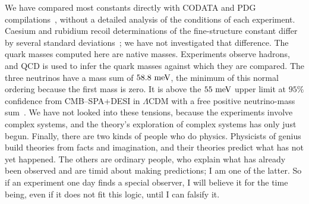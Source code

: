 \documentclass[aps,prx,reprint,longbibliography]{revtex4-2}
\begin{document}
We have compared most constants directly with CODATA and PDG compilations~\cite{CODATA,PDG}, without a detailed analysis of the conditions of each experiment. Caesium and rubidium recoil determinations of the fine-structure constant differ by several standard deviations~\cite{Parker,Morel}; we have not investigated that difference. The quark masses computed here are native masses. Experiments observe hadrons, and QCD is used to infer the quark masses against which they are compared. The three neutrinos have a mass sum of $58.8\ {\rm meV}$, the minimum of this normal ordering because the first mass is zero. It is above the $55\ {\rm meV}$ upper limit at $95\%$ confidence from CMB--SPA+DESI in $\Lambda$CDM with a free positive neutrino-mass sum~\cite{SPT}. We have not looked into these tensions, because the experiments involve complex systems, and the theory's exploration of complex systems has only just begun. Finally, there are two kinds of people who do physics. Physicists of genius build theories from facts and imagination, and their theories predict what has not yet happened. The others are ordinary people, who explain what has already been observed and are timid about making predictions; I am one of the latter. So if an experiment one day finds a special observer, I will believe it for the time being, even if it does not fit this logic, until I can falsify it.
\end{document}
